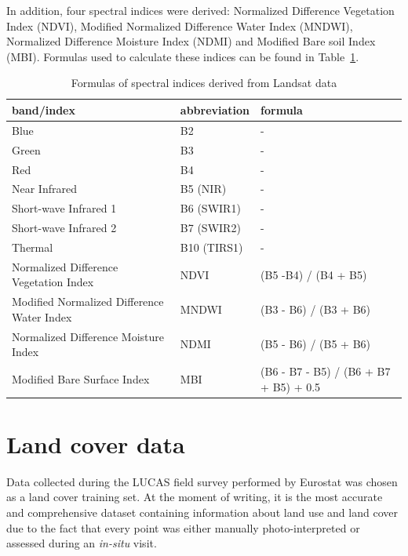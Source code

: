 \documentclass{amuthesis}
\begin{document}
In addition, four spectral indices were derived: Normalized Difference
Vegetation Index (NDVI), Modified Normalized Difference Water Index
(MNDWI), Normalized Difference Moisture Index (NDMI) and Modified Bare
soil Index (MBI). Formulas used to calculate these indices can be found
in Table~\ref{tbl-tabela1}.

\hypertarget{tbl-tabela1}{}
\begin{table}
\caption{\label{tbl-tabela1}Formulas of spectral indices derived from Landsat data }\tabularnewline

\centering
\begin{tabular}{|>{\raggedright\arraybackslash}p{4cm}|>{}l|>{}l|}
\toprule
\textbf{band/index} & \textbf{abbreviation} & \textbf{formula}\\
\midrule
Blue & B2 & -\\
\hline
Green & B3 & -\\
\hline
Red & B4 & -\\
\hline
Near Infrared & B5 (NIR) & -\\
\hline
Short-wave Infrared 1 & B6 (SWIR1) & -\\
\hline
Short-wave Infrared 2 & B7 (SWIR2) & -\\
\hline
Thermal & B10 (TIRS1) & -\\
\hline
Normalized Difference Vegetation Index & NDVI & (B5 -B4) / (B4 + B5)\\
\hline
Modified Normalized Difference Water Index & MNDWI & (B3 - B6) / (B3 + B6)\\
\hline
Normalized Difference Moisture Index & NDMI & (B5 - B6) / (B5 + B6)\\
\hline
Modified Bare Surface Index & MBI & (B6 - B7 - B5) / (B6 + B7 + B5) + 0.5\\
\bottomrule
\end{tabular}
\end{table}

\hypertarget{sec-landcover}{%
\section{Land cover data}\label{sec-landcover}}

Data collected during the LUCAS field survey performed by Eurostat was
chosen as a land cover training set. At the moment of writing, it is the
most accurate and comprehensive dataset containing information about
land use and land cover \autocite{pflugmacher_mapping_2019} due to the
fact that every point was either manually photo-interpreted or assessed
during an \emph{in-situ} visit.
\end{document}
